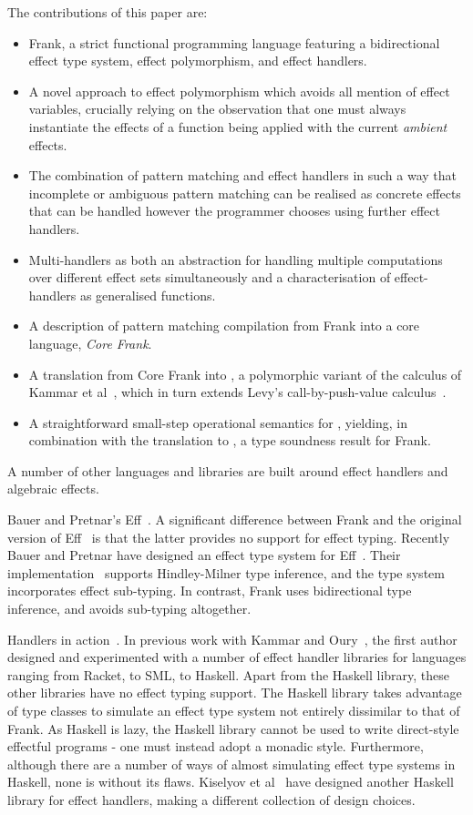 The contributions of this paper are:
\begin{itemize}
\item Frank, a strict functional programming language featuring a
  bidirectional effect type system, effect polymorphism, and effect
  handlers.
\item A novel approach to effect polymorphism which avoids all mention
  of effect variables, crucially relying on the observation that one
  must always instantiate the effects of a function being applied with
  the current \emph{ambient} effects.
\item The combination of pattern matching and effect handlers in such
  a way that incomplete or ambiguous pattern matching can be realised
  as concrete effects that can be handled however the programmer
  chooses using further effect handlers.
\item Multi-handlers as both an abstraction for handling multiple
  computations over different effect sets simultaneously and a
  characterisation of effect-handlers as generalised functions.
\item A description of pattern matching compilation from Frank into a
  core language, \emph{Core Frank}.
\item A translation from Core Frank into \feff, a polymorphic variant
  of the \lameff calculus of Kammar et al~\cite{KammarLO13}, which in
  turn extends Levy's call-by-push-value calculus~\cite{Levy2004}.
\item A straightforward small-step operational semantics for \feff,
  yielding, in combination with the translation to \feff, a type
  soundness result for Frank.
\end{itemize}

A number of other languages and libraries are built around effect
handlers and algebraic effects.

Bauer and Pretnar's Eff~\cite{BauerP12}. A significant difference
between Frank and the original version of Eff~\cite{BauerP12} is that
the latter provides no support for effect typing. Recently Bauer and
Pretnar have designed an effect type system for
Eff~\cite{BauerP13}. Their implementation~\cite{Pretnar13} supports
Hindley-Milner type inference, and the type system incorporates effect
sub-typing. In contrast, Frank uses bidirectional type inference, and
avoids sub-typing altogether.

Handlers in action~\cite{KammarLO13}. In previous work with Kammar and
Oury~\cite{KammarLO13}, the first author designed and experimented
with a number of effect handler libraries for languages ranging from
Racket, to SML, to Haskell. Apart from the Haskell library, these
other libraries have no effect typing support. The Haskell library
takes advantage of type classes to simulate an effect type system not
entirely dissimilar to that of Frank. As Haskell is lazy, the Haskell
library cannot be used to write direct-style effectful programs - one
must instead adopt a monadic style. Furthermore, although there are a
number of ways of almost simulating effect type systems in Haskell,
none is without its flaws. Kiselyov et al~\cite{KiselyovSS13} have
designed another Haskell library for effect handlers, making a
different collection of design choices.

